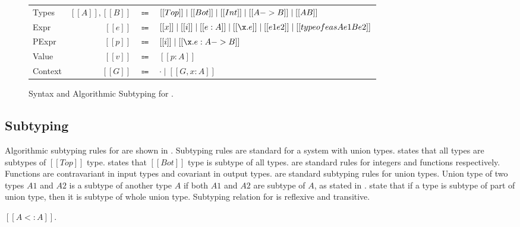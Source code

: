 \begin{figure}[t]
  \begin{small}
    \centering
    \begin{tabular}{lrcl} \toprule
      Types & $[[A]], [[B]]$ & $\Coloneqq$ & $ [[Top]] \mid [[Bot]] \mid [[Int]] \mid [[A -> B]] \mid [[A \/ B]] $ \\
      Expr & $[[e]]$ & $\Coloneqq$ & $[[x]] \mid [[i]] \mid [[e:A]] \mid [[\x.e]] \mid [[e1 e2]] \mid [[typeof e as A e1 B e2]]$\\
      PExpr & $[[p]]$ & $\Coloneqq$ & $[[i]] \mid [[\x.e : A -> B]] $\\
      Value & $[[v]]$ & $\Coloneqq$ & $[[p:A]]$\\
      Context & $[[G]]$ & $\Coloneqq$ & $ \cdot \mid [[G , x : A]]$ \\
      \bottomrule
    \end{tabular}
  \end{small}
  \begin{small}
    \centering
  \end{small}
  \caption{Syntax and Algorithmic Subtyping for \cal.  }
  \label{fig:union:syntax}
\end{figure}

\subsection{Subtyping}
\label{sec:union:sub}
Algorithmic subtyping rules for \cal are shown in . Subtyping rules are standard
for a system with union types.
 states that all types are subtypes of $[[Top]]$ type.  states that $[[Bot]]$ type
is subtype of all types.  are standard rules for integers and functions respectively.
Functions are contravariant in input types and covariant in output types.  are
standard subtyping rules for union types. Union type of two types $A1$ and $A2$ is a subtype of another
type $A$ if both $A1$ and $A2$ are subtype of $A$, as stated in .  state
that if a type is subtype of part of union type, then it is subtype of whole union type.
Subtyping relation for \cal is reflexive and transitive.

\begin{lemma}
  $[[A <: A]]$.
\label{lemma:union:refl}
\end{lemma}

